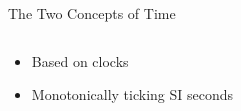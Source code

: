 \documentclass[aspectratio=1610, 9pt]{beamer}
\begin{document}
\begin{frame}{The Two Concepts of Time}
\begin{columns}[t, onlytextwidth]
\begin{column}{0.525\textwidth}
{        \begin{itemize}
          \item Based on clocks
          \item Monotonically ticking SI seconds
        \end{itemize}
      }
    \end{column}
  \end{columns}
  \medskip
  \begin{columns}[t, onlytextwidth]
    \begin{column}{0.475\textwidth}
    \end{column}
    \hfill
    \begin{column}{0.525\textwidth}
    \end{column}
  \end{columns}
\end{frame}
\end{document}
